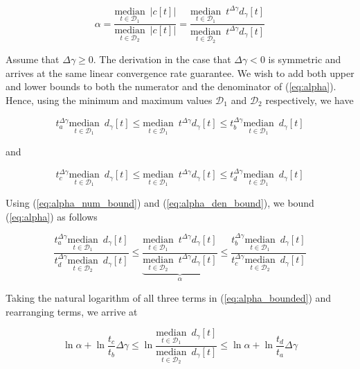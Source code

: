 \documentclass{segabs}
\newcommand{\deltagamma}{{\Delta\gamma}}
\newcommand{\Done}{{\mathcal{D}_1}}
\newcommand{\Dtwo}{{\mathcal{D}_2}}
\newcommand{\undermedian}[2]{\underset{#1}{\text{median}}\,\,\,#2}
\begin{document}
\begin{equation}
\label{eq:alpha}
\alpha = \frac{\undermedian{t \in \Done}{ |c[t]| } }{\undermedian{t \in \Dtwo}{|c[t]|} } = \frac{\undermedian{t \in \Done}{t^\deltagamma d_\gamma[t]} }{\undermedian{t \in \Dtwo}{t^\deltagamma d_\gamma[t]} }
\end{equation}


Assume that $\deltagamma \geq 0$. The derivation in the case that $\deltagamma < 0$ is symmetric and arrives at the same linear convergence rate guarantee.  We wish to add both upper and lower bounds to both the numerator and the denominator of (\ref{eq:alpha}).  Hence, using the minimum and maximum values $\Done$ and $\Dtwo$ respectively, we have

\begin{equation}
\label{eq:alpha_num_bound}
 t_a^\deltagamma \undermedian{t \in \Done}{ d_\gamma[t]}  \leq \undermedian{t \in \Done}{t^\deltagamma d_\gamma[t]}  \leq t_b^\deltagamma \undermedian{t \in \Done}{ d_\gamma[t]} 
\end{equation}

and

\begin{equation}
\label{eq:alpha_den_bound}
 t_c^\deltagamma \undermedian{t \in \Done}{ d_\gamma[t]}  \leq \undermedian{t \in \Done}{t^\deltagamma d_\gamma[t]}  \leq t_d^\deltagamma \undermedian{t \in \Done}{ d_\gamma[t]} 
\end{equation}

Using (\ref{eq:alpha_num_bound}) and (\ref{eq:alpha_den_bound}), we bound (\ref{eq:alpha}) as follows

\begin{equation}
\label{eq:alpha_bounded}
\frac{t_a^\deltagamma\undermedian{t \in \Done}{ d_\gamma[t]} }{t_d^\deltagamma\undermedian{t \in \Dtwo}{ d_\gamma[t]} }\leq \underbrace{ \frac{\undermedian{t \in \Done}{t^\deltagamma d_\gamma[t]} }{\undermedian{t \in \Dtwo}{t^\deltagamma d_\gamma[t]} }}_\alpha \leq
\frac{t_b^\deltagamma\undermedian{t \in \Done}{ d_\gamma[t]} }{t_c^\deltagamma\undermedian{t \in \Dtwo}{ d_\gamma[t]} }
\end{equation}

Taking the natural logarithm of all three terms in (\ref{eq:alpha_bounded}) and rearranging terms, we arrive at

\begin{equation}
\label{eq:alpha_bounded_two}
\ln \alpha + \ln \frac{t_c}{t_b}  \deltagamma \leq \ln \frac{\undermedian{t \in \Done}{ d_\gamma[t]}}{\undermedian{t \in \Dtwo}{ d_\gamma[t]}} \leq \ln \alpha + \ln \frac{t_d}{t_a} \deltagamma 
\end{equation}
\end{document}
